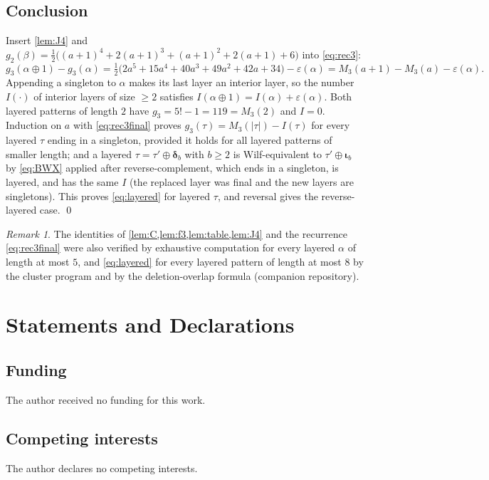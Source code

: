 \documentclass[11pt,reqno]{amsart}
\theoremstyle{plain}
\theoremstyle{definition}
\theoremstyle{remark}
\newtheorem{remark}[remark]{Remark}
\let\greekiota\iota
\renewcommand{\iota}{\boldsymbol{\greekiota}}
\newcommand{\dd}{\boldsymbol{\delta}}
\begin{document}
\subsection{Conclusion}
Insert \cref{lem:J4} and $g_2(\beta)=\tfrac12\bigl((a+1)^4+2(a+1)^3+(a+1)^2+2(a+1)+6\bigr)$ into \eqref{eq:rec3}:
\begin{equation}\label{eq:rec3final}
g_3(\alpha\oplus1)-g_3(\alpha)=\tfrac12\bigl(2a^5+15a^4+40a^3+49a^2+42a+34\bigr)-\varepsilon(\alpha)=M_3(a+1)-M_3(a)-\varepsilon(\alpha).
\end{equation}
Appending a singleton to $\alpha$ makes its last layer an interior layer, so the number $I(\cdot)$ of interior layers of size $\ge2$ satisfies $I(\alpha\oplus1)=I(\alpha)+\varepsilon(\alpha)$. Both layered patterns of length $2$ have $g_3=5!-1=119=M_3(2)$ and $I=0$. Induction on $a$ with \eqref{eq:rec3final} proves $g_3(\tau)=M_3(|\tau|)-I(\tau)$ for every layered $\tau$ ending in a singleton, provided it holds for all layered patterns of smaller length; and a layered $\tau=\tau'\oplus\dd_b$ with $b\ge2$ is Wilf-equivalent to $\tau'\oplus\iota_b$ by \eqref{eq:BWX} applied after reverse-complement, which ends in a singleton, is layered, and has the same $I$ (the replaced layer was final and the new layers are singletons). This proves \eqref{eq:layered} for layered $\tau$, and reversal gives the reverse-layered case. \qed

\begin{remark}
The identities of \cref{lem:C,lem:f3,lem:table,lem:J4} and the recurrence \eqref{eq:rec3final} were also verified by exhaustive computation for every layered $\alpha$ of length at most $5$, and \eqref{eq:layered} for every layered pattern of length at most $8$ by the cluster program and by the deletion-overlap formula (companion repository).
\end{remark}

\section*{Statements and Declarations}

\subsection*{Funding}
The author received no funding for this work.

\subsection*{Competing interests}
The author declares no competing interests.
\end{document}
